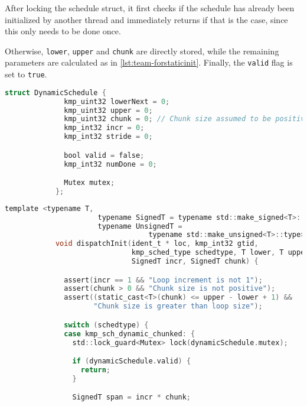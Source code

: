 \begin{itemize}
	      After locking the schedule struct, it first checks if the schedule has already been
	      initialized by another thread and immediately returns if that is the case, since this only
	      needs to be done once.

	      Otherwise, \texttt{lower}, \texttt{upper} and \texttt{chunk} are directly stored, while
	      the remaining parameters are calculated as in \cref{lst:team-forstaticinit}. Finally, the
	      \texttt{valid} flag is set to \texttt{true}.

	      \begin{lstlisting}[language=C, caption={struct Team::DynamicSchedule},
          label={lst:team-dynamicschedule}, escapechar=@]
            struct DynamicSchedule {
              kmp_uint32 lowerNext = 0;
              kmp_uint32 upper = 0;
              kmp_uint32 chunk = 0; // Chunk size assumed to be positive
              kmp_int32 incr = 0;
              kmp_int32 stride = 0;

              bool valid = false;
              kmp_int32 numDone = 0;

              Mutex mutex;
            };
          \end{lstlisting}

	      \begin{lstlisting}[language=C, caption={void Team::dispatchInit},
          label={lst:team-dispatchinit}, escapechar=@]
            template <typename T,
                      typename SignedT = typename std::make_signed<T>::type,
                      typename UnsignedT =
                                  typename std::make_unsigned<T>::type>
            void dispatchInit(ident_t * loc, kmp_int32 gtid,
                              kmp_sched_type schedtype, T lower, T upper,
                              SignedT incr, SignedT chunk) {

              assert(incr == 1 && "Loop increment is not 1");
              assert(chunk > 0 && "Chunk size is not positive");
              assert((static_cast<T>(chunk) <= upper - lower + 1) &&
                     "Chunk size is greater than loop size");

              switch (schedtype) {
              case kmp_sch_dynamic_chunked: {
                std::lock_guard<Mutex> lock(dynamicSchedule.mutex);

                if (dynamicSchedule.valid) {
                  return;
                }

                SignedT span = incr * chunk;


\end{lstlisting}
\end{itemize}
